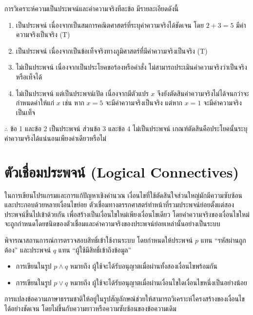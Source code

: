 \begin{solution}
การวิเคราะห์ความเป็นประพจน์และค่าความจริงทีละข้อ มีรายละเอียดดังนี้
\begin{enumerate}[label=\textbf{\arabic*.}]
    \item เป็นประพจน์ เนื่องจากเป็นสมการคณิตศาสตร์ที่ระบุค่าความจริงได้ชัดเจน โดย $2 + 3 = 5$ มีค่าความจริงเป็นจริง ($\text{T}$)
    \item เป็นประพจน์ เนื่องจากเป็นข้อเท็จจริงทางภูมิศาสตร์ที่มีค่าความจริงเป็นจริง ($\text{T}$)
    \item ไม่เป็นประพจน์ เนื่องจากเป็นประโยคขอร้องหรือคำสั่ง ไม่สามารถประเมินค่าความจริงว่าเป็นจริงหรือเท็จได้
    \item ไม่เป็นประพจน์ แต่เป็นประพจน์เปิด เนื่องจากมีตัวแปร $x$ จึงยังตัดสินค่าความจริงไม่ได้จนกว่าจะกำหนดค่าให้แก่ $x$ เช่น หาก $x = 5$ จะมีค่าความจริงเป็นจริง แต่หาก $x = 1$ จะมีค่าความจริงเป็นเท็จ
\end{enumerate}
$\therefore$ ข้อ 1 และข้อ 2 เป็นประพจน์ ส่วนข้อ 3 และข้อ 4 ไม่เป็นประพจน์ เกณฑ์ตัดสินคือประโยคนั้นระบุค่าความจริงได้แน่นอนเพียงค่าเดียวหรือไม่ \solhere
\end{solution}

\section{ตัวเชื่อมประพจน์ (Logical Connectives)}
\label{sec:logical-connectives}

ในการเขียนโปรแกรมและการแก้ปัญหาเชิงคำนวณ เงื่อนไขที่ใช้ตัดสินใจส่วนใหญ่มักมีความซับซ้อนและประกอบด้วยหลายเงื่อนไขย่อย ตัวเชื่อมทางตรรกศาสตร์ทำหน้าที่รวมประพจน์ย่อยตั้งแต่สองประพจน์ขึ้นไปเข้าด้วยกัน เพื่อสร้างเป็นเงื่อนไขใหม่เพียงเงื่อนไขเดียว โดยค่าความจริงของเงื่อนไขใหม่จะถูกกำหนดโดยชนิดของตัวเชื่อมและค่าความจริงของประพจน์ย่อยเหล่านั้นอย่างเป็นระบบ~\parencite{mendelson2015introduction}

พิจารณาสถานการณ์การตรวจสอบสิทธิ์เข้าใช้งานระบบ โดยกำหนดให้ประพจน์ $p$ แทน ``รหัสผ่านถูกต้อง'' และประพจน์ $q$ แทน ``ผู้ใช้มีสิทธิ์เข้าถึงข้อมูล''
\begin{itemize}
    \item การเขียนในรูป $p \land q$ หมายถึง ผู้ใช้จะได้รับอนุญาตเมื่อผ่านทั้งสองเงื่อนไขพร้อมกัน
    \item การเขียนในรูป $p \lor q$ หมายถึง ผู้ใช้จะได้รับอนุญาตเมื่อผ่านเงื่อนไขใดเงื่อนไขหนึ่งเป็นอย่างน้อย
\end{itemize}
การแปลงข้อความภาษาธรรมชาติให้อยู่ในรูปสัญลักษณ์ช่วยให้สามารถวิเคราะห์โครงสร้างของเงื่อนไขได้อย่างชัดเจน โดยไม่ขึ้นกับความยาวหรือความซับซ้อนของข้อความเดิม

